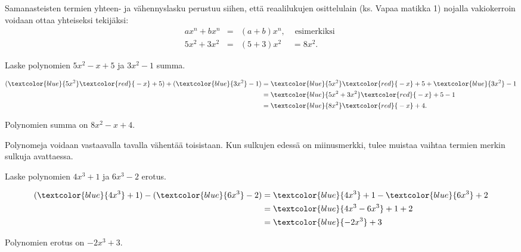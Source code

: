 Samanasteisten termien yhteen- ja vähennyslasku perustuu siihen, että reaalilukujen osittelulain (ks. Vapaa matikka 1) nojalla vakiokerroin voidaan ottaa yhteiseksi tekijäksi:
\[ \begin{array}{rcll}
ax^n+bx^n &=&(a+b)x^n, & \text{ esimerkiksi }\\
5x^2+3x^2 &=& (5+3)x^2 &= 8x^2.
\end{array} 
\]

\begin{esimerkki}
Laske polynomien $5x^2-x+5$ ja $3x^2-1$ summa.
    \begin{esimratk}
        \begin{align*}
            (\textcolor{blue}{5x^2} \textcolor{red}{{}-x} + 5) + (\textcolor{blue}{3x^2} -1) 
            &=\textcolor{blue}{5x^2} \textcolor{red}{{}-x} + 5 + \textcolor{blue}{3x^2} -1 \\
            &=\textcolor{blue}{5x^2+3x^2} \textcolor{red}{{}-x} +5-1\\
            &=\textcolor{blue}{8x^2} \textcolor{red}{{}-x}+4.
        \end{align*}
    \end{esimratk}
    \begin{esimvast}
        Polynomien summa on $8x^2-x+4$.
    \end{esimvast}
\end{esimerkki}

Polynomeja voidaan vastaavalla tavalla vähentää toisistaan. Kun sulkujen edessä on
miinusmerkki, tulee muistaa vaihtaa termien merkin sulkuja avattaessa.

\begin{esimerkki}
    Laske polynomien $4x^3+1$ ja $6x^3-2$ erotus.
    \begin{esimratk}
        \begin{align*}
		(\textcolor{blue}{4x^3}+1)-(\textcolor{blue}{6x^3}-2) 
		&= \textcolor{blue}{4x^3}+1 - \textcolor{blue}{6x^3} + 2 \\
		&= \textcolor{blue}{4x^3-6x^3} +1 +2 \\
		&=\textcolor{blue}{-2x^3}+3
        \end{align*}
    \end{esimratk}
    \begin{esimvast}
        Polynomien erotus on $-2x^3+3$.
    \end{esimvast}
\end{esimerkki}

